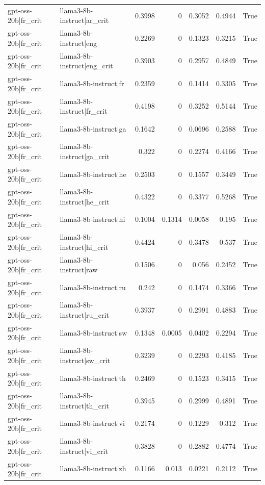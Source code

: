 \begin{table}
\begin{tabular}{l l r r r r l}
gpt-oss-20b|fr_crit & llama3-8b-instruct|ar_crit & 0.3998 & 0 & 0.3052 & 0.4944 & True \\
gpt-oss-20b|fr_crit & llama3-8b-instruct|eng & 0.2269 & 0 & 0.1323 & 0.3215 & True \\
gpt-oss-20b|fr_crit & llama3-8b-instruct|eng_crit & 0.3903 & 0 & 0.2957 & 0.4849 & True \\
gpt-oss-20b|fr_crit & llama3-8b-instruct|fr & 0.2359 & 0 & 0.1414 & 0.3305 & True \\
gpt-oss-20b|fr_crit & llama3-8b-instruct|fr_crit & 0.4198 & 0 & 0.3252 & 0.5144 & True \\
gpt-oss-20b|fr_crit & llama3-8b-instruct|ga & 0.1642 & 0 & 0.0696 & 0.2588 & True \\
gpt-oss-20b|fr_crit & llama3-8b-instruct|ga_crit & 0.322 & 0 & 0.2274 & 0.4166 & True \\
gpt-oss-20b|fr_crit & llama3-8b-instruct|he & 0.2503 & 0 & 0.1557 & 0.3449 & True \\
gpt-oss-20b|fr_crit & llama3-8b-instruct|he_crit & 0.4322 & 0 & 0.3377 & 0.5268 & True \\
gpt-oss-20b|fr_crit & llama3-8b-instruct|hi & 0.1004 & 0.1314 & 0.0058 & 0.195 & True \\
gpt-oss-20b|fr_crit & llama3-8b-instruct|hi_crit & 0.4424 & 0 & 0.3478 & 0.537 & True \\
gpt-oss-20b|fr_crit & llama3-8b-instruct|raw & 0.1506 & 0 & 0.056 & 0.2452 & True \\
gpt-oss-20b|fr_crit & llama3-8b-instruct|ru & 0.242 & 0 & 0.1474 & 0.3366 & True \\
gpt-oss-20b|fr_crit & llama3-8b-instruct|ru_crit & 0.3937 & 0 & 0.2991 & 0.4883 & True \\
gpt-oss-20b|fr_crit & llama3-8b-instruct|sw & 0.1348 & 0.0005 & 0.0402 & 0.2294 & True \\
gpt-oss-20b|fr_crit & llama3-8b-instruct|sw_crit & 0.3239 & 0 & 0.2293 & 0.4185 & True \\
gpt-oss-20b|fr_crit & llama3-8b-instruct|th & 0.2469 & 0 & 0.1523 & 0.3415 & True \\
gpt-oss-20b|fr_crit & llama3-8b-instruct|th_crit & 0.3945 & 0 & 0.2999 & 0.4891 & True \\
gpt-oss-20b|fr_crit & llama3-8b-instruct|vi & 0.2174 & 0 & 0.1229 & 0.312 & True \\
gpt-oss-20b|fr_crit & llama3-8b-instruct|vi_crit & 0.3828 & 0 & 0.2882 & 0.4774 & True \\
gpt-oss-20b|fr_crit & llama3-8b-instruct|zh & 0.1166 & 0.013 & 0.0221 & 0.2112 & True \\

\end{tabular}
\end{table}
